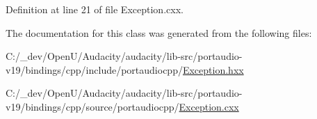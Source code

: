 Definition at line 21 of file Exception.\+cxx.



The documentation for this class was generated from the following files\+:\begin{DoxyCompactItemize}
\item 
C\+:/\+\_\+dev/\+Open\+U/\+Audacity/audacity/lib-\/src/portaudio-\/v19/bindings/cpp/include/portaudiocpp/\hyperlink{_exception_8hxx}{Exception.\+hxx}\item 
C\+:/\+\_\+dev/\+Open\+U/\+Audacity/audacity/lib-\/src/portaudio-\/v19/bindings/cpp/source/portaudiocpp/\hyperlink{_exception_8cxx}{Exception.\+cxx}\end{DoxyCompactItemize}
